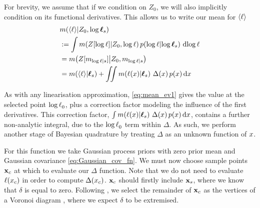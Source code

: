 \documentclass{article}
\begin{document}
For brevity, we assume that if we condition on $Z_0$, we will also implicitly condition on its functional derivatives. This allows us to write our mean for  $\inty{\lfn}$
%
\begin{align}
& \mean{\inty{\lfn}}{Z_0,\tvr_s} \nonumber\\
& \deq \int \mean{Z[\tr]}{Z_0,\tr}
\p{\tr}{\tvr_s}\, \ud \tr 
\nonumber\\
& = \mean{Z[m_{\tr|s}]}{Z_0,m_{\tr|s}} \nonumber\\
& = \mean{\inty{\lfn}}{\vr_s} + \iint \mean{\lfn(\lfv)}{\vr_s}\,
\Delta(\lfv)\,\po{\lfv}\ud\lfv
\label{eq:mean_ev1}
\end{align}

As with any linearisation approximation, \eqref{eq:mean_ev1} gives the value at the selected point $\tr_0$, plus a correction factor modeling the influence of the first derivatives. This correction factor, 
$\int \mean{\lfn(\lfv)}{\vr_s}\,
\Delta(\lfv)\,\po{\lfv}\ud\lfv$,
contains a further non-analytic integral, due to the $\tr_0$ term within $\Delta$. As such, we perform another stage of Bayesian quadrature by treating $\Delta$ as an unknown function of $\lfv$.


For this function we take Gaussian process priors with zero prior mean and Gaussian covariance \eqref{eq:Gaussian_cov_fn}. We must now choose sample points $\vlfv_c$ at which to evaluate our $\Delta$ function. 
Note that we do not need to evaluate $\lfn(\lfv_c)$ in order to compute $\Delta(\lfv_c)$.
$\vlfv_c$ should firstly include $\vlfv_s$, where we know that $\delta$ is equal to zero. Following \citet{BQR}, we select the remainder of $\vlfv_c$  as the  vertices of a Voronoi diagram \citep{okabe1997locational}, where we expect $\delta$ to be extremised. 
\end{document}
